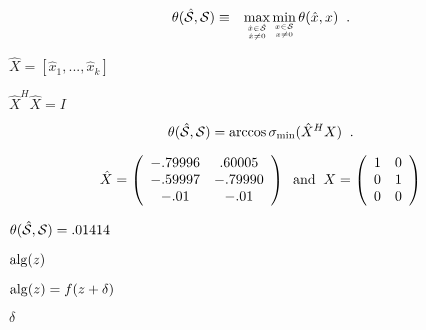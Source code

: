 {\newpage\clearpage
{}%
\begin{eqnarray*}
\theta (\hat{\cal S}, {\cal S}) & \equiv  &
\max_{\hat{x} \in {\hat{\cal S}} \atop \hat{x} \neq 0}
\min_{x \in {\cal S} \atop x \neq 0}
\theta ( \hat{x},x ) \; \; .
\end{eqnarray*}%
\lthtmldisplayZ
\lthtmlcheckvsize\clearpage}

{\newpage\clearpage
{}%
$\hat{X}=[\hat{x}_1 , ... , \hat{x}_k]$%
\lthtmlinlinemathZ
\lthtmlcheckvsize\clearpage}

{\newpage\clearpage
{}%
$\hat{X}^H \hat{X} = I$%
\lthtmlinlinemathZ
\lthtmlcheckvsize\clearpage}

{\newpage\clearpage
{}%
\begin{displaymath}
\theta ( \hat{\cal S}, {\cal S} ) = \arccos \sigma_{\min} ( \hat{X}^H X ) \; \; .
\end{displaymath}%
\lthtmldisplayZ
\lthtmlcheckvsize\clearpage}

{\newpage\clearpage
{}%
\begin{displaymath}
\hat{X} = \left( \begin{array}{cc} -.79996 & .60005 \\-.59997 & -.79990 \\-.01 & -.01 \end{array} \right) 
\; \; {\rm and} \; \;
X = \left( \begin{array}{cc} 1 & 0 \\0 & 1 \\0 & 0 \end{array} \right) 
\end{displaymath}%
\lthtmldisplayZ
\lthtmlcheckvsize\clearpage}

{\newpage\clearpage
{}%
$\theta ( \hat{\cal S}, {\cal S} ) = .01414$%
\lthtmlinlinemathZ
\lthtmlcheckvsize\clearpage}

{\newpage\clearpage
{}%
${\rm alg}(z)$%
\lthtmlinlinemathZ
\lthtmlcheckvsize\clearpage}

{\newpage\clearpage
{}%
${\rm alg}(z) = f(z+\delta)$%
\lthtmlinlinemathZ
\lthtmlcheckvsize\clearpage}

{\newpage\clearpage
{}%
$\delta$%
\lthtmlinlinemathZ
\lthtmlcheckvsize\clearpage}

